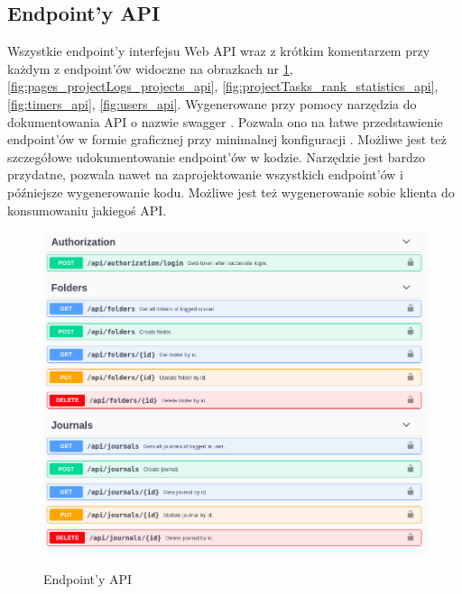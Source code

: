 \documentclass[a4paper,11pt]{report}
\begin{document}
\subsection{Endpoint'y API}
Wszystkie endpoint'y interfejsu Web API wraz z krótkim komentarzem przy każdym z endpoint'ów widoczne na obrazkach nr 
\ref{fig:auth_folders_journals_api}, \ref{fig:pages_projectLogs_projects_api}, \ref{fig:projectTasks_rank_statistics_api}, \ref{fig:timers_api}, \ref{fig:users_api}.
Wygenerowane przy pomocy narzędzia do dokumentowania API o nazwie swagger \cite{swagger}.
Pozwala ono na łatwe przedstawienie endpoint'ów w formie graficznej przy minimalnej konfiguracji \cite{swagger-dotnet}.
Możliwe jest też szczegółowe udokumentowanie endpoint'ów w kodzie.
Narzędzie jest bardzo przydatne, pozwala nawet na zaprojektowanie wszystkich endpoint'ów i późniejsze wygenerowanie kodu.
Możliwe jest też wygenerowanie sobie klienta do konsumowaniu jakiegoś API.
\begin{figure}[H]
	\centering
	\includegraphics[scale=0.4]{implementacja/backend/auth_folders_journals_api}\\
	\caption{Endpoint'y API}
	\label{fig:auth_folders_journals_api}
\end{figure}
\end{document}
